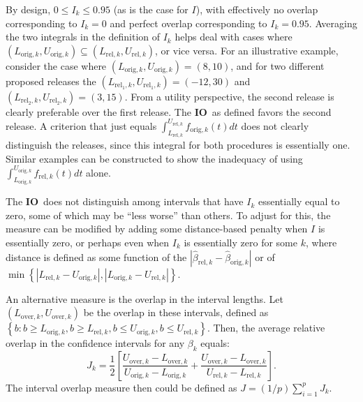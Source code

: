 \documentclass[12pt]{article}
\def\IO{\ensuremath{\mathbf{IO}}} %
\begin{document}
By design, $0 \leq I_k \leq 0.95$ (as is the case for $I$), with
effectively no overlap corresponding to $I_k =0$ and perfect
overlap corresponding to $I_k = 0.95$.  Averaging the two
integrals in the definition of $I_k$ helps deal with cases where
$(L_{\mathrm{orig},k}, U_{\mathrm{orig},k}) \subseteq
(L_{\mathrm{rel},k}, U_{\mathrm{rel},k})$, or vice versa.  For an
illustrative example, consider the case where
$(L_{\mathrm{orig},k}, U_{\mathrm{orig},k}) = (8, 10)$, and for
two different proposed releases the $(L_{\mathrm{rel_1},k},
U_{\mathrm{rel_1},k})=(-12, 30)$ and $(L_{\mathrm{rel_2},k},
U_{\mathrm{rel_2},k})=(3, 15)$. From a utility perspective, the
second release is clearly preferable over the first release. The
\IO\ as defined favors the second release.  A criterion that just
equals $\int_{L_{\mathrm{rel},k}}^{U_{\mathrm{rel},k}}
f_{\mathrm{orig},k}(t) dt$ does not clearly distinguish the
releases, since this integral for both procedures is essentially
one. Similar examples can be constructed to show the inadequacy of
using $\int_{L_{\mathrm{orig},k}}^{U_{\mathrm{orig},k}}
f_{\mathrm{rel},k}(t) dt$ alone.

The \IO\ does not distinguish among intervals that have $I_k$
essentially equal to zero, some of which may be ``less worse''
than others. To adjust for this, the measure can be modified by
adding some distance-based penalty when $I$ is essentially zero,
or perhaps even when $I_k$ is essentially zero for some $k$, where
distance is defined as some function of the
$|\hat{\beta}_{\mathrm{rel},k} - \hat{\beta}_{\mathrm{orig},k}|$
or of $\min\left\{|L_{\mathrm{rel},k} - U_{\mathrm{orig},k}|,
|L_{\mathrm{orig},k} - U_{\mathrm{rel},k}|\right\}$.

An alternative measure is the overlap in the interval lengths. Let
$(L_{\mathrm{over},k}, U_{\mathrm{over},k})$ be the overlap in
these intervals, defined as $\left\{b: b \geq L_{\mathrm{orig},k},
b \geq L_{\mathrm{rel},k},  b \leq U_{\mathrm{orig},k},  b \leq
U_{\mathrm{rel},k}\right\}$. Then, the average relative overlap in
the confidence intervals for any $\beta_{k}$ equals:
\begin{equation}
J_k = \frac{1}{2} \left[\frac{U_{\mathrm{over},k} -
L_{\mathrm{over},k}}{U_{\mathrm{orig},k} - L_{\mathrm{orig},k}} +
\frac{U_{\mathrm{over},k} -
L_{\mathrm{over},k}}{U_{\mathrm{rel},k} -
L_{\mathrm{rel},k}}\right].
\end{equation}
The interval overlap measure then could be defined as $J = (1/p)
\sum_{i=1}^p J_k$.
\end{document}
